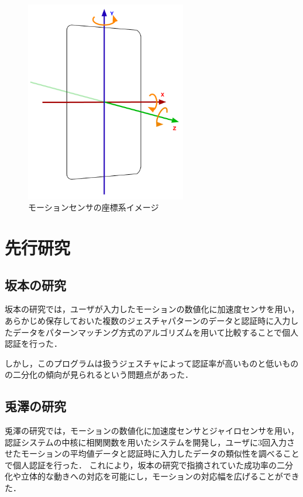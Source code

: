 \documentclass[11pt]{jreport}
\begin{document}
    \begin{figure}[hbtp]
      \begin{center}
        \includegraphics[width=7cm, bb=0 0 373 469]{SmartphoneSensor.pdf}
        \caption{モーションセンサの座標系イメージ}
        \label{sensor}
      \end{center}
    \end{figure}

\chapter{先行研究}
	\section{坂本の研究}
	坂本の研究\cite{sakamoto}では，ユーザが入力したモーションの数値化に加速度センサを用い，あらかじめ保存しておいた複数のジェスチャパターンのデータと認証時に入力したデータをパターンマッチング方式のアルゴリズムを用いて比較することで個人認証を行った．

    しかし，このプログラムは扱うジェスチャによって認証率が高いものと低いものの二分化の傾向が見られるという問題点があった．

	\section{兎澤の研究}
    兎澤の研究\cite{tozawa}では，モーションの数値化に加速度センサとジャイロセンサを用い，認証システムの中核に相関関数を用いたシステムを開発し，ユーザに3回入力させたモーションの平均値データと認証時に入力したデータの類似性を調べることで個人認証を行った．
    これにより，坂本の研究で指摘されていた成功率の二分化や立体的な動きへの対応を可能にし，モーションの対応幅を広げることができた．
\end{document}
